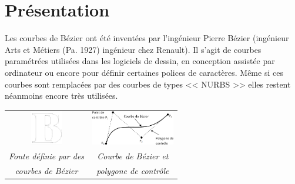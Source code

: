 \documentclass[10pt,fleqn]{article} %
\begin{document}

\vspace{1cm}
\pagestyle{fancy}
\thispagestyle{plain}

\section{Présentation}

\begin{minipage}[c]{0.5\linewidth}
Les courbes de Bézier ont été inventées par l'ingénieur Pierre Bézier (ingénieur Arts et Métiers (Pa. 1927) ingénieur chez Renault). Il s'agit de courbes paramétrées utilisées dans les logiciels de dessin, en conception assistée par ordinateur ou encore pour définir certaines polices de caractères. Même si ces courbes sont remplacées par des courbes de types << NURBS >> elles restent néanmoins encore très utilisées. 
\end{minipage} \hfill
\begin{minipage}[c]{0.47\linewidth}
\begin{center}
\begin{tabular}{cc}
\includegraphics[height=1.5cm]{images/B} &
\includegraphics[height=1.5cm]{images/Courbe} \\
\textit{Fonte définie par des} & 
\textit{Courbe de Bézier et} \\
\textit{courbes de Bézier} & 
\textit{polygone de contrôle}  \\
\end{tabular}
\end{center}
\end{minipage}
\end{document}
